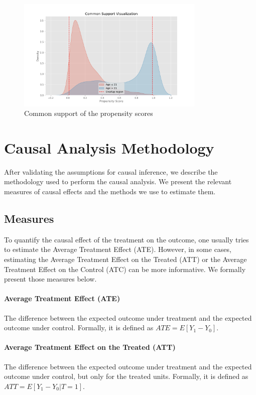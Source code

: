 \documentclass{article}
\begin{document}
\begin{figure}
    \centering
    \caption{Common support of the propensity scores}
    \label{fig:common_support}
    \includegraphics[width = 0.8\textwidth]{plots/common_support.png}
\end{figure}



\section{Causal Analysis Methodology}

After validating the assumptions for causal inference, we describe the methodology used to perform the causal analysis. We present the relevant measures of causal effects and the methods we use to estimate them.

\subsection{Measures}

To quantify the causal effect of the treatment on the outcome, one usually tries to estimate the Average Treatment Effect (ATE). However, in some cases, estimating the Average Treatment Effect on the Treated (ATT) or the Average Treatment Effect on the Control (ATC) can be more informative. We formally present those measures below.

\paragraph{Average Treatment Effect (ATE)} The difference between the expected outcome under treatment and the expected outcome under control. Formally, it is defined as $ATE = E[Y_1 - Y_0]$.

\paragraph{Average Treatment Effect on the Treated (ATT)} The difference between the expected outcome under treatment and the expected outcome under control, but only for the treated units. Formally, it is defined as $ATT = E[Y_1 - Y_0 | T = 1]$. 
\end{document}
